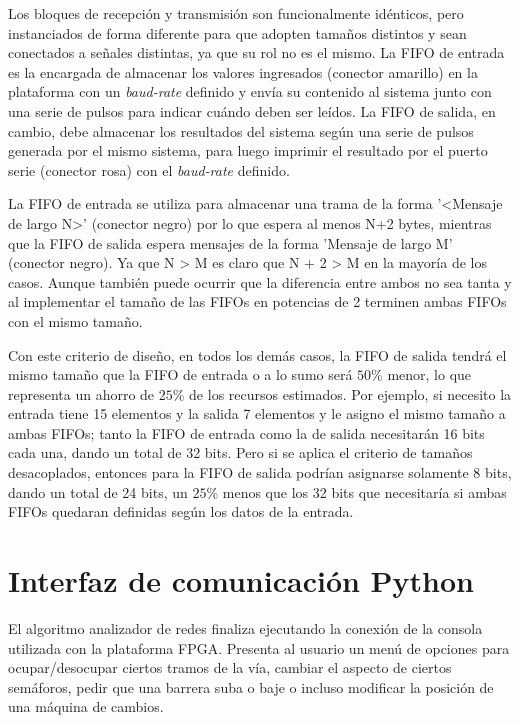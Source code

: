 		Los bloques de recepción y transmisión son funcionalmente idénticos, pero instanciados de forma diferente para que adopten tamaños distintos y sean conectados a señales distintas, ya que su rol no es el mismo. La FIFO de entrada es la encargada de almacenar los valores ingresados (conector amarillo) en la plataforma con un \textit{baud-rate} definido y envía su contenido al sistema junto con una serie de pulsos para indicar cuándo deben ser leídos. La FIFO de salida, en cambio, debe almacenar los resultados del sistema según una serie de pulsos generada por el mismo sistema, para luego imprimir el resultado por el puerto serie (conector rosa) con el \textit{baud-rate} definido.

		La FIFO de entrada se utiliza para almacenar una trama de la forma '<Mensaje de largo N>' (conector negro) por lo que espera al menos N+2 bytes, mientras que la FIFO de salida espera mensajes de la forma 'Mensaje de largo M' (conector negro). Ya que N > M es claro que N + 2 > M en la mayoría de los casos. Aunque también puede ocurrir que la diferencia entre ambos no sea tanta y al implementar el tamaño de las FIFOs en potencias de 2 terminen ambas FIFOs con el mismo tamaño. 

		Con este criterio de diseño, en todos los demás casos, la FIFO de salida tendrá el mismo tamaño que la FIFO de entrada o a lo sumo será $50$\% menor, lo que representa un ahorro de $25$\% de los recursos estimados. Por ejemplo, si necesito la entrada tiene 15 elementos y la salida 7 elementos y le asigno el mismo tamaño a ambas FIFOs; tanto la FIFO de entrada como la de salida necesitarán 16 bits cada una, dando un total de 32 bits. Pero si se aplica el criterio de tamaños desacoplados, entonces para la FIFO de salida podrían asignarse solamente 8 bits, dando un total de 24 bits, un $25$\% menos que los 32 bits que necesitaría si ambas FIFOs quedaran definidas según los datos de la entrada.
		
\section{Interfaz de comunicación Python}

	El algoritmo analizador de redes finaliza ejecutando la conexión de la consola utilizada con la plataforma FPGA. Presenta al usuario un menú de opciones para ocupar/desocupar ciertos tramos de la vía, cambiar el aspecto de ciertos semáforos, pedir que una barrera suba o baje o incluso modificar la posición de una máquina de cambios.
	
